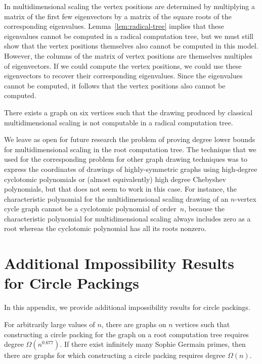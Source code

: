 \documentclass[oribibl,10pt]{llncs}
\begin{document}
\begin{appendix}
In multidimensional scaling the vertex positions are determined by multiplying a matrix of the first few eigenvectors by a matrix of the square roots of the corresponding eigenvalues.  Lemma~\ref{lem:radical-tree} implies that these eigenvalues cannot be computed in a radical computation tree, but we must still show that the vertex positions themselves also cannot be computed in this model. However, the columns of the matrix of vertex positions are themselves multiples of eigenvectors. If we could compute the vertex positions, we could use these eigenvectors to recover their corresponding eigenvalues. Since the eigenvalues cannot be computed, it follows that the vertex positions also cannot be computed.

\begin{theorem}
There exists a graph on six vertices such that the drawing produced by classical multidimensional scaling is not computable in a radical computation tree.
\end{theorem}

We leave as open for future research the problem of proving degree lower bounds for multidimensional scaling in the root computation tree. The technique that we used for the corresponding problem for other graph drawing techniques was to express the coordinates of drawings of highly-symmetric graphs using high-degree cyclotomic polynomials or (almost equivalently) high degree Chebyshev polynomials, but that does not seem to work in this case. For instance, the characteristic polynomial for the multidimensional scaling drawing of an $n$-vertex cycle graph cannot be a cyclotomic polynomial of order~$n$, because the characteristic polynomial for multidimensional scaling always includes zero as a root whereas the cyclotomic polynomial has all its roots nonzero.

\clearpage
\section{Additional Impossibility Results for Circle Packings}
\label{app:circles}
In this appendix, we provide additional impossibility results for circle packings.
\begin{theorem}
For arbitrarily large values of $n$,
there are graphs on $n$ vertices such that constructing a circle packing for the graph on a root computation tree requires degree $\Omega(n^{0.677})$. If there exist infinitely many Sophie Germain primes, then there are graphs for which constructing a circle packing requires degree $\Omega(n)$.
\end{theorem}


\end{appendix}
\end{document}
